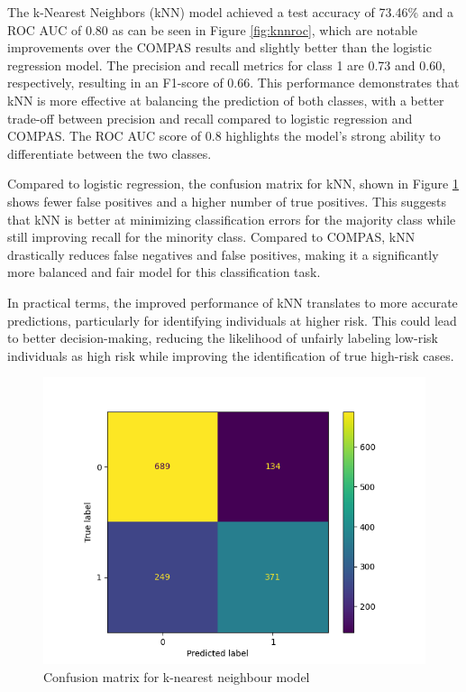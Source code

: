 	The k-Nearest Neighbors (kNN) model achieved a test accuracy of 73.46\% and a ROC AUC of 0.80 as can be seen in Figure \ref{fig:knnroc}, which are notable improvements over the COMPAS results and slightly better than the logistic regression model. The precision and recall metrics for class 1 are 0.73 and 0.60, respectively, resulting in an F1-score of 0.66. This performance demonstrates that kNN is more effective at balancing the prediction of both classes, with a better trade-off between precision and recall compared to logistic regression and COMPAS. The ROC AUC score of 0.8 highlights the model’s strong ability to differentiate between the two classes.
	
	Compared to logistic regression, the confusion matrix for kNN, shown in Figure \ref{fig:knncm} shows fewer false positives and a higher number of true positives. This suggests that kNN is better at minimizing classification errors for the majority class while still improving recall for the minority class. Compared to COMPAS, kNN drastically reduces false negatives and false positives, making it a significantly more balanced and fair model for this classification task.
	
	In practical terms, the improved performance of kNN translates to more accurate predictions, particularly for identifying individuals at higher risk. This could lead to better decision-making, reducing the likelihood of unfairly labeling low-risk individuals as high risk while improving the identification of true high-risk cases. 	
	
	
	\begin{figure}[H]
		\centering
		\includegraphics[width=0.7\linewidth]{img/knn_cm}
		\caption{Confusion matrix for k-nearest neighbour model}
		\label{fig:knncm}
	\end{figure}
	

